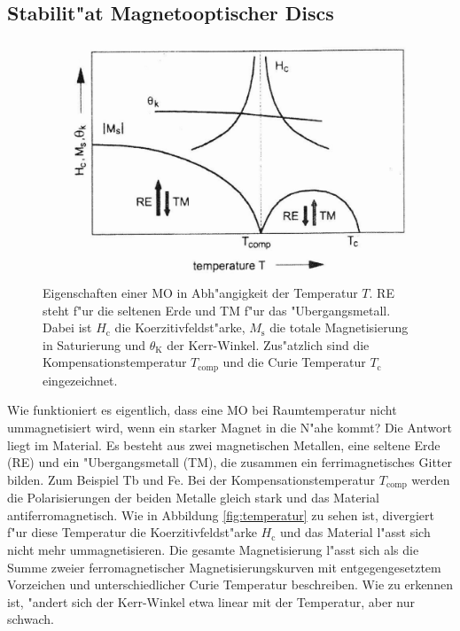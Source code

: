 \subsection{Stabilit"at Magnetooptischer Discs}
\begin{figure}[htbp]
    \begin{minipage}[t][][b]{0.48\textwidth}
        \centering
        \includegraphics[width=\textwidth]{../images/temperatur.png}
    \end{minipage}
    \hfill
    \begin{minipage}[t][][t]{0.48\textwidth}
        \caption{
            Eigenschaften einer MO in Abh"angigkeit der Temperatur $T$.
            RE steht f"ur die seltenen Erde und TM f"ur das "Ubergangsmetall.
            Dabei ist $H_\text{c}$ die Koerzitivfeldst"arke, $M_\text{s}$ die totale Magnetisierung in Saturierung und $\theta_\text{K}$ der Kerr-Winkel.
            Zus"atzlich sind die Kompensationstemperatur $T_\text{comp}$ und die Curie Temperatur $T_\text{c}$ eingezeichnet.
            \cite{roll}
            }
        \label{fig:temperatur}
    \end{minipage}
\end{figure}
Wie funktioniert es eigentlich, dass eine MO bei Raumtemperatur nicht ummagnetisiert wird, wenn ein starker Magnet in die N"ahe kommt?
Die Antwort liegt im Material.
Es besteht aus zwei magnetischen Metallen, eine seltene Erde (RE) und ein "Ubergangsmetall (TM), die zusammen ein ferrimagnetisches Gitter bilden.
Zum Beispiel Tb und Fe.
Bei der Kompensationstemperatur $T_\text{comp}$ werden die Polarisierungen der beiden Metalle gleich stark und das Material antiferromagnetisch.
Wie in Abbildung \vref{fig:temperatur} zu sehen ist, divergiert f"ur diese Temperatur die Koerzitivfeldst"arke $H_\text{c}$ und das Material l"asst sich nicht mehr ummagnetisieren.
Die gesamte Magnetisierung l"asst sich als die Summe zweier ferromagnetischer Magnetisierungskurven mit entgegengesetztem Vorzeichen und unterschiedlicher Curie Temperatur beschreiben.
Wie zu erkennen ist, "andert sich der Kerr-Winkel etwa linear mit der Temperatur, aber nur schwach.

